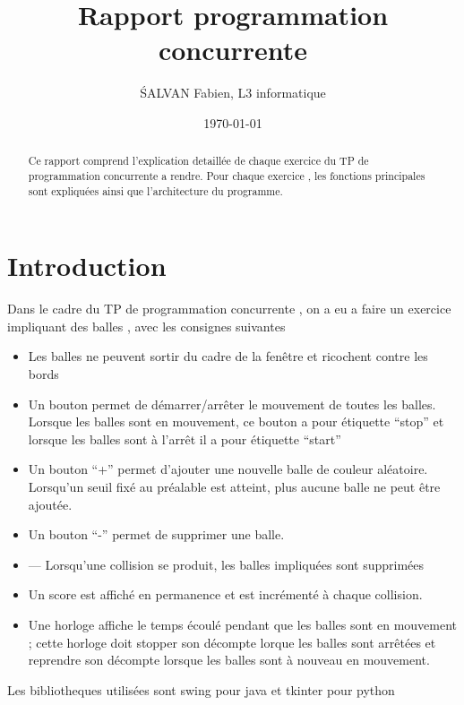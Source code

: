 \documentclass{report}
\title{Rapport programmation concurrente}
\author{\'SALVAN Fabien, L3 informatique}
\date{\today}
\begin{document}
\maketitle %


\begin{abstract}
    Ce rapport comprend l'explication detaillée de chaque exercice du TP de programmation concurrente a rendre. Pour chaque exercice , les fonctions principales sont expliquées ainsi que l'architecture du programme.
\end{abstract}

\section{Introduction}
Dans le cadre du TP de programmation concurrente , on a eu a faire un exercice impliquant des balles , avec les consignes suivantes 
\begin{itemize}
\item Les balles ne peuvent sortir du cadre de la fenêtre et ricochent contre les bords
\item Un bouton permet de démarrer/arrêter le mouvement de toutes les balles. Lorsque les balles
sont en mouvement, ce bouton a pour étiquette “stop” et lorsque les balles sont à l’arrêt il
a pour étiquette “start”

\item Un bouton “+” permet d’ajouter une nouvelle balle de couleur aléatoire. Lorsqu’un seuil
fixé au préalable est atteint, plus aucune balle ne peut être ajoutée.

\item Un bouton “-” permet de supprimer une balle.

\item — Lorsqu’une collision se produit, les balles impliquées sont supprimées

\item Un score est affiché en permanence et est incrémenté à chaque collision.

\item Une horloge affiche le temps écoulé pendant que les balles sont en mouvement ; cette horloge
doit stopper son décompte lorque les balles sont arrêtées et reprendre son décompte lorsque
les balles sont à nouveau en mouvement.
  \end{itemize}


Les bibliotheques utilisées sont swing pour java et tkinter pour python
\end{document}
